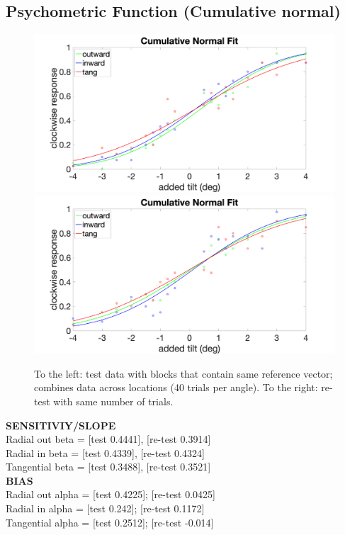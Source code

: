 \documentclass[11pt]{article} %
\begin{document}
\subsection{Psychometric Function (Cumulative normal)}
\begin{figure}[H]
\centering %
\includegraphics[scale=.08]{Images/PF_set1.png}
\includegraphics[scale=.08]{Images/PF_set2.png}
\caption{To the left: test data with blocks that contain same reference vector; combines data across locations (40 trials per angle). To the right: re-test with same number of trials.}
\end{figure}

\textbf{SENSITIVIY/SLOPE}
\\
Radial out beta = [test 0.4441], [re-test 0.3914]
\\
Radial in beta = [test 0.4339], [re-test 0.4324]
\\
Tangential beta = [test 0.3488], [re-test 0.3521]
\\
\textbf{BIAS}
\\
Radial out alpha = [test 0.4225]; [re-test 0.0425]
\\
Radial in alpha = [test 0.242]; [re-test 0.1172]
\\
Tangential alpha = [test 0.2512]; [re-test -0.014]
\end{document}
